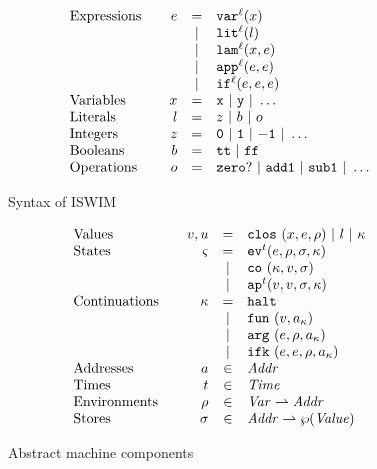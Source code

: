 \documentclass[9pt]{sigplanconf} %
\begin{document}
\begin{figure}
\small
\[
\begin{array}{l@{\qquad}rcl}
\text{Expressions} & \mexp &=& \svar[^\mlab]\mvar\\
&&|& \slit[^\mlab]\mlit\\
&&|& \slam[^\mlab]\mvar\mexp\\
&&|& \sapp[^\mlab]\mexp\mexp \\
&&|& \sif[^\mlab]\mexp\mexp\mexp \\
\text{Variables}&\mvar &=& \syntax{x}\ |\ \syntax{y}\ |\ \dots\\
\text{Literals}&\mlit &=& \mnum\ |\ \mbln\ |\ \mop\\
\text{Integers}&\mnum &=& \syntax{0}\ |\ \syntax{1}\ |\ \syntax{-1}\ |\ \dots\\
\text{Booleans}&\mbln &=& \strue\ |\ \sfalse\\
\text{Operations}&\mop &=& \syntax{zero?}\ |\ \syntax{add1}\ |\ \syntax{sub1}\ |\ \dots
\end{array}
\]
\caption{Syntax of ISWIM}
\label{fig:syntax}
\end{figure}

\begin{figure}
\small
\[
\begin{array}{l@{\qquad}rcl}
\text{Values} & \mval,\mvalx{u} &=& \clos{\mvar,\mexp,\menv}\ |\ \mlit\ |\ \mkont\\
\text{States} & \mstate &=& \ev[^\mcntr]{\mexp,\menv,\msto,\mkont}\\
                       &&|& \co{\mkont,\mval,\msto}\\
                       &&|& \ap[^\mcntr]{\mval,\mval,\msto,\mkont}\\
\text{Continuations} & \mkont &=& \kmt\\
&&|& \kfn{\mval,\mkaddr}\\
&&|& \kar{\mexp,\menv,\mkaddr}\\
&&|& \kif{\mexp,\mexp,\menv,\mkaddr}\\
\text{Addresses} &\maddr&\in&\Addr \\
\text{Times} &\mcntr&\in&\Counter \\
\text{Environments} &\menv&\in& \Var \rightharpoonup \Addr\\
\text{Stores} &\msto&\in& \Addr \rightharpoonup \wp(\Value)
\end{array}
\]
\caption{Abstract machine components}
\label{fig:domains}
\end{figure}
\end{document}
